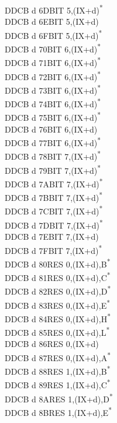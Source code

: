 \documentclass[twoside,openright,a4paper]{book}
\begin{document}
\begin{multicols}{3}
{\begin{tabbing}
	DDCB d 6D\>BIT 5,(IX+d)\textsuperscript{*}\\
	DDCB d 6E\>BIT 5,(IX+d)\\
	DDCB d 6F\>BIT 5,(IX+d)\textsuperscript{*}\\
	DDCB d 70\>BIT 6,(IX+d)\textsuperscript{*}\\
	DDCB d 71\>BIT 6,(IX+d)\textsuperscript{*}\\
	DDCB d 72\>BIT 6,(IX+d)\textsuperscript{*}\\
	DDCB d 73\>BIT 6,(IX+d)\textsuperscript{*}\\
	DDCB d 74\>BIT 6,(IX+d)\textsuperscript{*}\\
	DDCB d 75\>BIT 6,(IX+d)\textsuperscript{*}\\
	DDCB d 76\>BIT 6,(IX+d)\\
	DDCB d 77\>BIT 6,(IX+d)\textsuperscript{*}\\
	DDCB d 78\>BIT 7,(IX+d)\textsuperscript{*}\\
	DDCB d 79\>BIT 7,(IX+d)\textsuperscript{*}\\
	DDCB d 7A\>BIT 7,(IX+d)\textsuperscript{*}\\
	DDCB d 7B\>BIT 7,(IX+d)\textsuperscript{*}\\
	DDCB d 7C\>BIT 7,(IX+d)\textsuperscript{*}\\
	DDCB d 7D\>BIT 7,(IX+d)\textsuperscript{*}\\
	DDCB d 7E\>BIT 7,(IX+d)\\
	DDCB d 7F\>BIT 7,(IX+d)\textsuperscript{*}\\
	DDCB d 80\>RES 0,(IX+d),B\textsuperscript{*}\\
	DDCB d 81\>RES 0,(IX+d),C\textsuperscript{*}\\
	DDCB d 82\>RES 0,(IX+d),D\textsuperscript{*}\\
	DDCB d 83\>RES 0,(IX+d),E\textsuperscript{*}\\
	DDCB d 84\>RES 0,(IX+d),H\textsuperscript{*}\\
	DDCB d 85\>RES 0,(IX+d),L\textsuperscript{*}\\
	DDCB d 86\>RES 0,(IX+d)\\
	DDCB d 87\>RES 0,(IX+d),A\textsuperscript{*}\\
	DDCB d 88\>RES 1,(IX+d),B\textsuperscript{*}\\
	DDCB d 89\>RES 1,(IX+d),C\textsuperscript{*}\\
	DDCB d 8A\>RES 1,(IX+d),D\textsuperscript{*}\\
	DDCB d 8B\>RES 1,(IX+d),E\textsuperscript{*}\\

\end{tabbing}}
\end{multicols}
\end{document}
